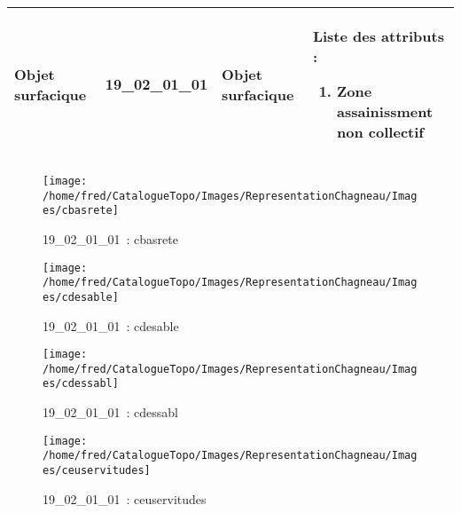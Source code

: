 \documentclass[12pt,titlepage]{book}
\begin{document}
\renewcommand{\arraystretch}{1.2}
\begin{supertabular}{|p{10cm}|c|p{13cm}|p{12cm}|}
 Objet surfacique & 19\_02\_01\_01 & Objet surfacique & Liste des attributs :
\begin{enumerate}
  \item Zone assainissment non collectif\end{enumerate}
\\
\hline
\end{supertabular}
\begin{figure}[h!]
  \hfill         %
  \begin{minipage}[t]{3cm}
    \begin{center}
      \texttt{[image: /home/fred/CatalogueTopo/Images/RepresentationChagneau/Images/cbasrete]}
      \caption[~19\_02\_01\_01]{\small{19\_02\_01\_01~:} \tiny{cbasrete}}\label{cbasrete}
    \end{center}
  \end{minipage}
  \begin{minipage}[t]{3cm}
    \begin{center}
      \texttt{[image: /home/fred/CatalogueTopo/Images/RepresentationChagneau/Images/cdesable]}
      \caption[~19\_02\_01\_01]{\small{19\_02\_01\_01~:} \tiny{cdesable}}\label{cdesable}
    \end{center}
  \end{minipage}
  \begin{minipage}[t]{3cm}
    \begin{center}
      \texttt{[image: /home/fred/CatalogueTopo/Images/RepresentationChagneau/Images/cdessabl]}
      \caption[~19\_02\_01\_01]{\small{19\_02\_01\_01~:} \tiny{cdessabl}}\label{cdessabl}
    \end{center}
  \end{minipage}
  \begin{minipage}[t]{3cm}
    \begin{center}
      \texttt{[image: /home/fred/CatalogueTopo/Images/RepresentationChagneau/Images/ceuservitudes]}
      \caption[~19\_02\_01\_01]{\small{19\_02\_01\_01~:} \tiny{ceuservitudes}}\label{ceuservitudes}
    \end{center}
  \end{minipage}
  \begin{minipage}[t]{3cm}

\end{minipage}
\end{figure}
\end{document}

